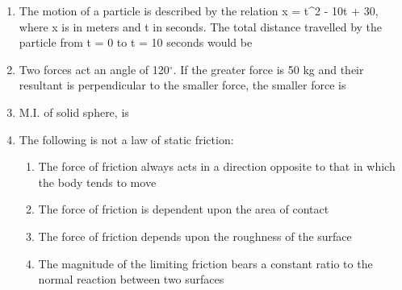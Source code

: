 \documentclass[11pt,a4paper]{article}
\begin{document}
\begin{enumerate}
\item{The motion of a particle is described by the relation x = t\^{}2 - 10t + 30, where x is in meters and t in seconds. The total distance travelled by the particle from t = 0 to t = 10 seconds would be
}
\\
\item{Two forces act an angle of 120$^\circ$. If the greater force is 50 kg and their resultant is perpendicular to the smaller force, the smaller force is
}
\\
\item{M.I. of solid sphere, is}
\\
\item{The following is not a law of static friction:}
\begin{enumerate}[label=\Alph*.]
\item{The force of friction always acts in a direction opposite to that in which the body tends to move}
\item{The force of friction is dependent upon the area of contact}
\item{The force of friction depends upon the roughness of the surface}
\item{The magnitude of the limiting friction bears a constant ratio to the normal reaction between two surfaces}

\end{enumerate}
\end{enumerate}
\end{document}
